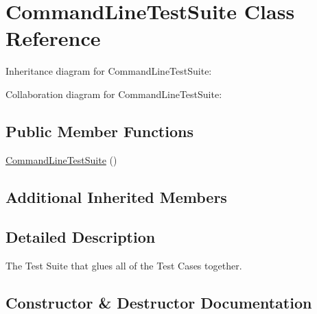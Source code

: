 \hypertarget{classCommandLineTestSuite}{}\section{Command\+Line\+Test\+Suite Class Reference}
\label{classCommandLineTestSuite}


Inheritance diagram for Command\+Line\+Test\+Suite\+:


Collaboration diagram for Command\+Line\+Test\+Suite\+:
\subsection*{Public Member Functions}
\begin{DoxyCompactItemize}
\item 
\hyperlink{classCommandLineTestSuite_a3657ceda427480b646b97517111784ae}{Command\+Line\+Test\+Suite} ()
\end{DoxyCompactItemize}
\subsection*{Additional Inherited Members}


\subsection{Detailed Description}
The Test Suite that glues all of the Test Cases together. 

\subsection{Constructor \& Destructor Documentation}
